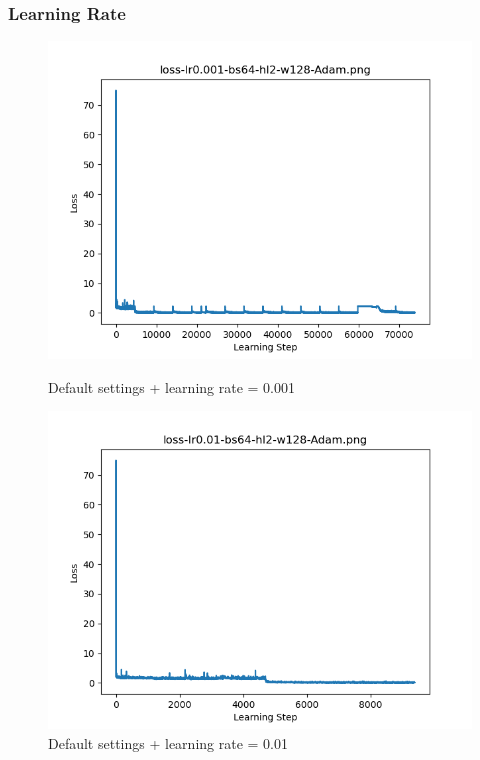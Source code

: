 \documentclass{article}[12pt]
\begin{document}
\subsubsection{Learning Rate}

    \begin{figure}[H]
        \includegraphics[width=\linewidth]{testsResults/loss/lr/def.png}
        \caption{Default settings + learning rate = 0.001}
        \endminipage\hfill
        \includegraphics[width=\linewidth]{testsResults/loss/lr/loss-lr0.01-bs64-hl2-w128-Adam.png}
        \caption{Default settings + learning rate = 0.01}
        \endminipage
    \end{figure}
\end{document}
